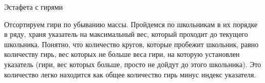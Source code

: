 \begin{tutorial}{Эстафета с гирями}

Отсортируем гири по убыванию массы. Пройдемся по школьникам в их порядке в ряду, храня указатель на максимальный вес, который проходит до текущего школьника. Понятно, что количество кругов, которые пробежит школьник, равно количеству гирь, вес которых не больше веса гири, на которую установлен указатель (гири, вес которых больше, просто не дойдут до этого школьника). Это количество легко находится как общее количество гирь минус индекс указателя.

\end{tutorial}
